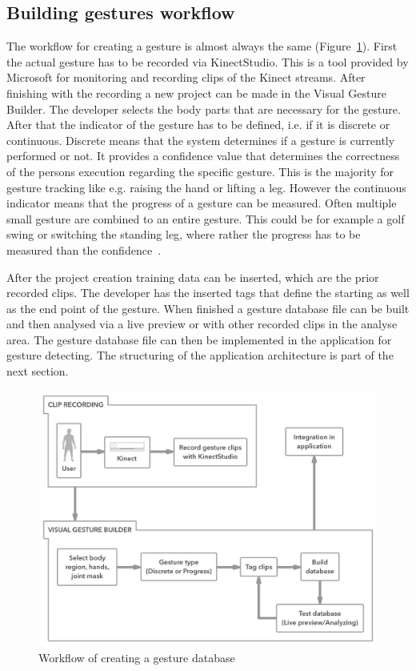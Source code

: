 \subsection{Building gestures workflow}
The workflow for creating a gesture is almost always the same (Figure~\ref{fig:5_3_gestureCreation}). 
First the actual gesture has to be recorded via KinectStudio. This is a tool provided by Microsoft for monitoring and recording clips of the Kinect streams. After finishing with the recording a new project can be made in the Visual Gesture Builder. The developer selects the body parts that are necessary for the gesture. After that the indicator of the gesture has to be defined, i.e. if it is discrete or continuous. Discrete means that the system determines if a gesture is currently performed or not. It provides a confidence value that determines the correctness of the persons execution regarding the specific gesture. This is the majority for gesture tracking like e.g. raising the hand or lifting a leg. However the continuous indicator means that the progress of a gesture can be measured. Often multiple small gesture are combined to an entire gesture. This could be for example a golf swing or switching the standing leg, where rather the progress has to be measured than the confidence~\cite{MicrosoftVGB}.

After the project creation training data can be inserted, which are the prior recorded clips. The developer has the inserted tags that define the starting as well as the end point of the gesture. When finished a gesture database file can be built and then analysed via a live preview or with other recorded clips in the analyse area. The gesture database file can then be implemented in the application for gesture detecting. The structuring of the application architecture is part of the next section.
\begin{figure}[htb]
	\centering
	\begin{minipage}[t]{1\linewidth}
		\centering
		\includegraphics[width=1\linewidth]{Pictures/5_3_gestureCreation}
		\caption{Workflow of creating a gesture database}
		\label{fig:5_3_gestureCreation}
	\end{minipage}
\end{figure}
